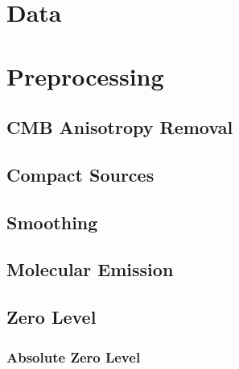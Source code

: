 \documentclass{emulateapj}
\begin{document}
\section{Data}
\label{sec:data}

\section{Preprocessing}
\label{sec:prepro}

\subsection{CMB Anisotropy Removal}
\label{sec:cmb}

\subsection{Compact Sources}
\label{sec:ptsrc}

\subsection{Smoothing}
\label{sec:smth}

\subsection{Molecular Emission}
\label{sec:mole}

\subsection{Zero Level}
\label{sec:zp}

\subsubsection{Absolute Zero Level}
\label{sec:zp_abs}
\end{document}
